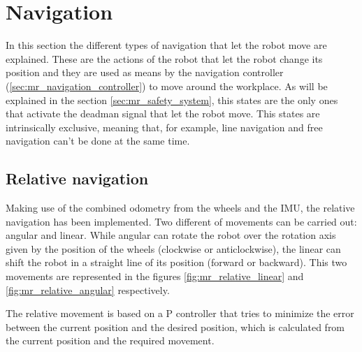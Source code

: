 \section{Navigation} %
\label{sec:mr_navigation}
In this section the different types of navigation that let the robot move are explained.
These are the actions of the robot that let the robot change its position and they are used as means by the navigation controller (\ref{sec:mr_navigation_controller}) to move around the workplace.
As will be explained in the section \ref{sec:mr_safety_system}, this states are the only ones that activate the deadman signal that let the robot move.
This states are intrinsically exclusive, meaning that, for example, line navigation and free navigation can't be done at the same time.

    \subsection{Relative navigation} %
    \label{sub:mr_relative_navigation}
    Making use of the combined odometry from the wheels and the IMU, the relative navigation has been implemented.
    Two different of movements can be carried out: angular and linear.
    While angular can rotate the robot over the rotation axis given by the position of the wheels (clockwise or anticlockwise), the linear can shift the robot in a straight line of its position (forward or backward).
    This two movements are represented in the figures \ref{fig:mr_relative_linear} and \ref{fig:mr_relative_angular} respectively.

    The relative movement is based on a P controller that tries to minimize the error between the current position and the desired position, which is calculated from the current position and the required movement.

